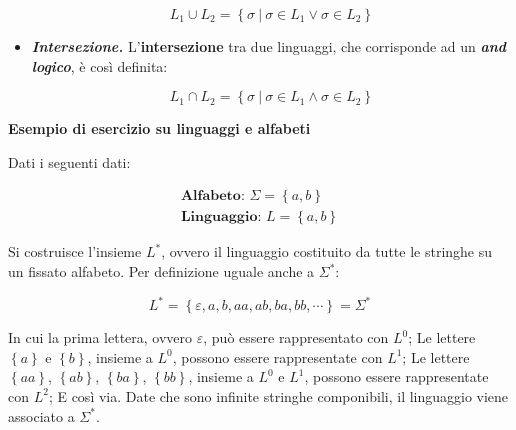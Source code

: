 \documentclass[a4paper]{article}
\begin{document}
\begin{itemize}
		\begin{equation*}
			L_{1} \cup L_{2} = \left\{\sigma \: | \: \sigma \in L_{1} \lor \sigma \in L_{2} \right\}
		\end{equation*}
	
		\item[\ding{45}] \textcolor{Red3}{\textbf{\emph{Intersezione.}}} L'\textbf{intersezione} tra due linguaggi, che corrisponde ad un \textbf{\emph{and logico}}, è così definita:
		
		\begin{equation*}
			L_{1} \cap L_{2} = \left\{\sigma \: | \: \sigma \in L_{1} \land \sigma \in L_{2} \right\}
		\end{equation*}
	\end{itemize}

	\newpage
	
	\begin{center}
		\large \textcolor{Green4}{\textbf{Esempio di esercizio su linguaggi e alfabeti}}
	\end{center}

	\noindent
	Dati i seguenti dati:
	
	\begin{gather*}
		\textbf{Alfabeto: } \Sigma = \left\{a, b\right\} \\
		\textbf{Linguaggio: } L = \left\{a, b\right\}
	\end{gather*}

	\noindent
	Si costruisce l'insieme $L^{*}$, ovvero il linguaggio costituito da tutte le stringhe su un fissato alfabeto. Per definizione uguale anche a $\Sigma^{*}$:
	
	\begin{equation*}
		L^{*} = \left\{\varepsilon, a, b, aa, ab, ba, bb, \cdots\right\} = \Sigma^{*}
	\end{equation*}

	\noindent
	In cui la prima lettera, ovvero $\varepsilon$, può essere rappresentato con $L^{0}$;\newline
	Le lettere $\left\{a\right\}$ e $\left\{b\right\}$, insieme a $L^{0}$, possono essere rappresentate con $L^{1}$; \newline
	Le lettere $\left\{aa\right\}$, $\left\{ab\right\}$, $\left\{ba\right\}$, $\left\{bb\right\}$, insieme a $L^0$ e $L^{1}$, possono essere rappresentate con $L^{2}$;\newline
	E così via. Date che sono infinite stringhe componibili, il linguaggio viene associato a $\Sigma^{*}$.
	
	\newpage
	
\end{document}
